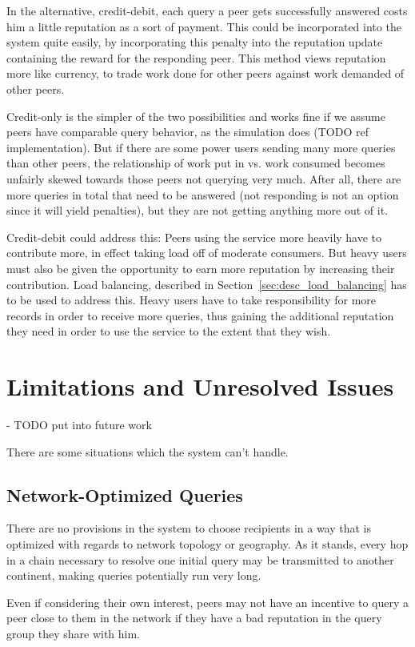 In the alternative, credit-debit, each query a peer gets successfully answered
costs him a little reputation as a sort of payment. This could be incorporated
into the system quite easily, by incorporating this penalty into the reputation
update containing the reward for the responding peer. This method views
reputation more like currency, to trade work done for other peers against work
demanded of other peers.

Credit-only is the simpler of the two possibilities and works fine if we assume
peers have comparable query behavior, as the simulation does (TODO ref
implementation). But if there are some power users sending many more queries
than other peers, the relationship of work put in vs. work consumed becomes
unfairly skewed towards those peers not querying very much. After all, there are
more queries in total that need to be answered (not responding is not an option
since it will yield penalties), but they are not getting anything more out of
it.

Credit-debit could address this: Peers using the service more heavily have to
contribute more, in effect taking load off of moderate consumers. But heavy
users must also be given the opportunity to earn more reputation by increasing
their contribution. Load balancing, described in
Section~\ref{sec:desc_load_balancing} has to be used to address this. Heavy
users have to take responsibility for more records in order to receive more
queries, thus gaining the additional reputation they need in order to use the
service to the extent that they wish.

\section{Limitations and Unresolved Issues}
- TODO put into future work

There are some situations which the system can't handle.

\subsection{Network-Optimized Queries}
There are no provisions in the system to choose recipients in a way that is
optimized with regards to network topology or geography. As it stands, every hop
in a chain necessary to resolve one initial query may be transmitted to another
continent, making queries potentially run very long.

Even if considering their own interest, peers may not have an incentive to query
a peer close to them in the network if they have a bad reputation in the query
group they share with him.

